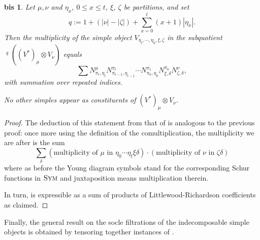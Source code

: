 \documentclass[11pt]{article}
\theoremstyle{plain}
\theoremstyle{nonumberplain}
\newtheorem{qf'bis}{\Cref{le.quot_filt'} bis}
\theoremstyle{plain}
\theoremstyle{nonumberplain}
\newtheorem{proof}{Proof}
\DeclareMathOperator{\usoc}{\underline{\mathrm{soc}}}
\DeclareMathOperator{\sym}{\cat{Sym}}
\newcommand{\cat}[1]{\textsc{#1}}
\begin{document}
\begin{qf'bis}
Let $\mu,\nu$ and $\eta_x$, $0\le x\le t$, $\xi$, $\zeta$ be partitions, and set
\begin{equation*}
 q:=1+(|\nu|-|\zeta|)+\sum_{x=0}^{t}(x+1)|\eta_x|.
\end{equation*}
Then the multiplicity of the simple object
$
V_{\eta_t,\cdots,\eta_0,\xi,\zeta}
$
in the subquotient  $\usoc^q((V^*)_\mu\otimes V_\nu)$ equals
  \begin{equation*}
   \sum N_{\pi_t, \eta_t}^{\mu}N_{\pi_{t-1}, \eta_{t-1}}^{\pi_t}\cdots N_{\pi_0, \eta_0}^{\pi_1}N_{\xi,\delta}^{\pi_{0}}N_{\zeta,\delta}^{\nu},
  \end{equation*}
with summation over repeated indices. 

No other simples appear as constituents of $(V^*)_\mu\otimes V_\nu$.
\end{qf'bis}
\begin{proof}
  The deduction of this statement from that of  is
  analogous to the previous proof: once more using the definition of
  the comultiplication, the multiplicity we are after is the sum
  \begin{equation}\label{eq:mults}
    \sum_\delta (\text{multiplicity of }\mu\text{ in }\eta_0\cdots\eta_t\xi\delta)\cdot (\text{multiplicity of }\nu\text{ in }\zeta\delta)
  \end{equation}
  where as before the Young diagram symbols stand for the
  corresponding Schur functions in $\sym$ and juxtaposition means
  multiplication therein.

  In turn,  is expressible as a sum of products of
  Littlewood-Richardson coefficients as claimed.
\end{proof}





Finally, the general result on the socle filtrations of the
indecomposable simple objects  is obtained by tensoring
together instances of .
\end{document}
